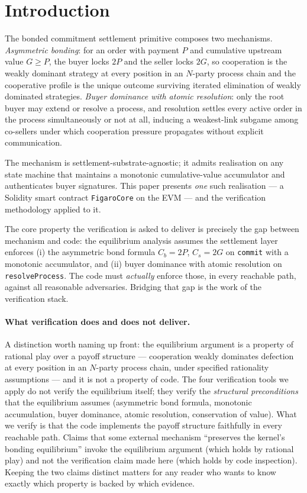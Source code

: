 \documentclass[11pt,a4paper]{article}
\theoremstyle{definition}
\theoremstyle{remark}
\newcommand{\pay}{P}
\newcommand{\cumval}{G}
\newcommand{\bbond}{C_b}
\newcommand{\sbond}{C_s}
\begin{document}
\section{Introduction}
\label{sec:intro}

The bonded commitment settlement primitive composes two mechanisms.
\emph{Asymmetric bonding}: for an order with payment $\pay$ and
cumulative upstream value $\cumval \geq \pay$, the buyer locks
$2\pay$ and the seller locks $2\cumval$, so cooperation is the
weakly dominant strategy at every position in an $N$-party process
chain and the cooperative profile is the unique outcome surviving
iterated elimination of weakly dominated strategies. \emph{Buyer
dominance with atomic resolution}: only the root buyer may extend or
resolve a process, and resolution settles every active order in the
process simultaneously or not at all, inducing a weakest-link subgame
among co-sellers under which cooperation pressure propagates without
explicit communication.

The mechanism is settlement-substrate-agnostic; it admits realisation
on any state machine that maintains a monotonic cumulative-value
accumulator and authenticates buyer signatures. This paper presents
\emph{one} such realisation --- a Solidity smart contract
\texttt{FigaroCore} on the EVM --- and the verification methodology
applied to it.

The core property the verification is asked to deliver is precisely
the gap between mechanism and code: the equilibrium analysis assumes
the settlement layer enforces (i) the asymmetric bond formula
$\bbond = 2\pay$, $\sbond = 2\cumval$ on \texttt{commit} with a
monotonic accumulator, and (ii) buyer dominance with atomic
resolution on \texttt{resolveProcess}. The code must \emph{actually}
enforce those, in every reachable path, against all reasonable
adversaries. Bridging that gap is the work of the verification stack.

\paragraph{What verification does and does not deliver.}
A distinction worth naming up front: the equilibrium argument is a
property of rational play over a payoff structure --- cooperation
weakly dominates defection at every position in an $N$-party process
chain, under specified rationality assumptions --- and it is not a
property of code. The four verification tools we apply do not verify
the equilibrium itself; they verify the \emph{structural
preconditions} that the equilibrium assumes (asymmetric bond
formula, monotonic accumulation, buyer dominance, atomic resolution,
conservation of value). What we verify is that the code implements
the payoff structure faithfully in every reachable path. Claims that
some external mechanism ``preserves the kernel's bonding
equilibrium'' invoke the equilibrium argument (which holds by
rational play) and not the verification claim made here (which holds
by code inspection). Keeping the two claims distinct matters for any
reader who wants to know exactly which property is backed by which
evidence.
\end{document}
